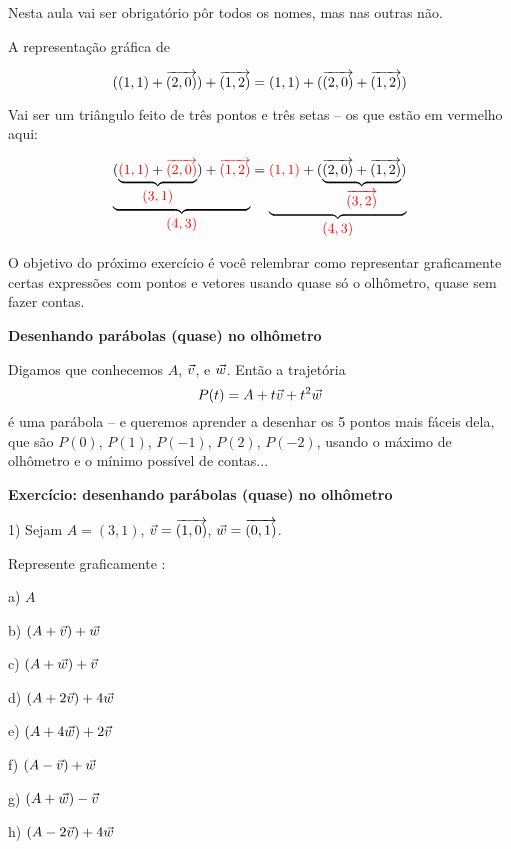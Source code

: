 \documentclass[oneside,12pt]{article}
\begin{document}
\msk

Nesta aula vai ser obrigatório pôr todos os nomes, mas nas outras não.

\newpage

A representação gráfica de

\def\und#1#2{\underbrace{#1}_{\textstyle#2}}
\def\Red#1{\ColorRed{#1}}

$$((1,1) + {\overrightarrow{(2,0)}}) + {\overrightarrow{(1,2)}} = (1,1) + ({\overrightarrow{(2,0)}} + {\overrightarrow{(1,2)}})$$

Vai ser um triângulo feito de três pontos e três setas -- os que estão
em vermelho aqui:

$$\und{(\und{\Red{(1,1)} + \Red{\VEC{2,0}}}{\Red{(3,1)}}) + \Red{\VEC{1,2}}}{\Red{(4,3)}} =
  \und{\Red{(1,1)} + (\und{\VEC{2,0} + \VEC{1,2}}{\Red{\VEC{3,2}}})}{\Red{(4,3)}}
$$

O objetivo do próximo exercício é você relembrar como representar
graficamente certas expressões com pontos e vetores usando quase só o
olhômetro, quase sem fazer contas.


\newpage

{\bf Desenhando parábolas (quase) no olhômetro}

Digamos que conhecemos $A$, ${\vec v}$, e ${\vec w}$. Então a trajetória
%
$$P(t) = A + t{\vec v} + t^2{\vec w}$$
%
é uma parábola -- e queremos aprender a desenhar os 5 pontos mais
fáceis dela, que são $P(0)$, $P(1)$, $P(-1)$, $P(2)$, $P(-2)$, usando
o máximo de olhômetro e o mínimo possível de contas...

\msk



\newpage


{\bf Exercício: desenhando parábolas (quase) no olhômetro}

1) Sejam $A=(3,1)$, ${\vec v} = {\overrightarrow{(1,0)}}$, ${\vec w} = {\overrightarrow{(0,1)}}$.

Represente graficamente :

a) $A$

b) $(A+{\vec v})+{\vec w}$

c) $(A+{\vec w})+{\vec v}$

d) $(A+2{\vec v})+4{\vec w}$

e) $(A+4{\vec w})+2{\vec v}$

f) $(A-{\vec v})+{\vec w}$

g) $(A+{\vec w})-{\vec v}$

h) $(A-2{\vec v})+4{\vec w}$
\end{document}
